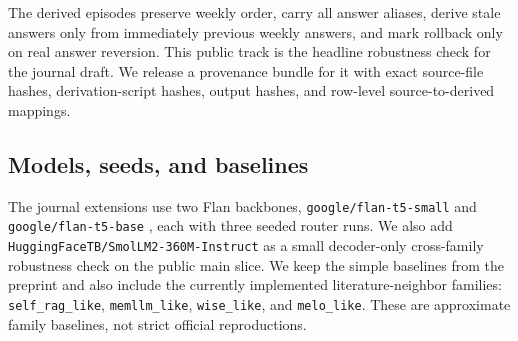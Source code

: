 The derived episodes preserve weekly order, carry all answer aliases, derive stale answers only from immediately previous weekly answers, and mark rollback only on real answer reversion. This public track is the headline robustness check for the journal draft. We release a provenance bundle for it with exact source-file hashes, derivation-script hashes, output hashes, and row-level source-to-derived mappings.

\subsection{Models, seeds, and baselines}

The journal extensions use two Flan backbones, \texttt{google/flan-t5-small} and \texttt{google/flan-t5-base} \citep{longpre2023flan}, each with three seeded router runs. We also add \texttt{HuggingFaceTB/SmolLM2-360M-Instruct} as a small decoder-only cross-family robustness check on the public main slice. We keep the simple baselines from the preprint and also include the currently implemented literature-neighbor families: \texttt{self\_rag\_like}, \texttt{memllm\_like}, \texttt{wise\_like}, and \texttt{melo\_like}. These are approximate family baselines, not strict official reproductions.
